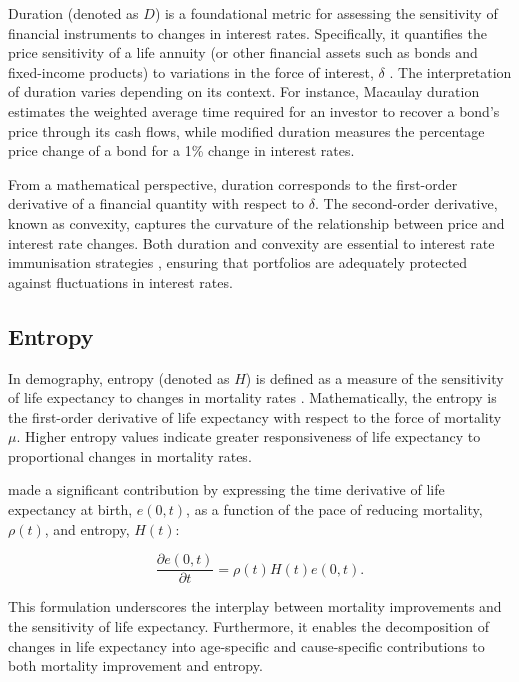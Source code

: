 \documentclass[12pt]{article}
\begin{document}
Duration (denoted as $D$) is a foundational metric for assessing the sensitivity of financial instruments to changes in interest rates. Specifically, it quantifies the price sensitivity of a life annuity (or other financial assets such as bonds and fixed-income products) to variations in the force of interest, $\delta$ \citep{milevsky2013life,charupat2016sluggish}. The interpretation of duration varies depending on its context. For instance, Macaulay duration estimates the weighted average time required for an investor to recover a bond's price through its cash flows, while modified duration measures the percentage price change of a bond for a 1\% change in interest rates.

From a mathematical perspective, duration corresponds to the first-order derivative of a financial quantity with respect to $\delta$. The second-order derivative, known as convexity, captures the curvature of the relationship between price and interest rate changes. Both duration and convexity are essential to interest rate immunisation strategies \citep{redington1951papers,fisher1971coping,shiu1990redington,santomero1997financial,courtois2007immunization}, ensuring that portfolios are adequately protected against fluctuations in interest rates.

\subsection{Entropy}\label{sec:Entropy}

In demography, entropy (denoted as $H$) is defined as a measure of the sensitivity of life expectancy to changes in mortality rates \citep{leser1955variations,keyfitz1977difference,demetrius1974demographic,goldman1986new, aburto2019threshold}. Mathematically, the entropy is the first-order derivative of life expectancy with respect to the force of mortality $\mu$. Higher entropy values indicate greater responsiveness of life expectancy to proportional changes in mortality rates.

\citet{Vaupel2003} made a significant contribution by expressing the time derivative of life expectancy at birth, $e(0, t)$, as a function of the pace of reducing mortality, $\rho(t)$, and entropy, $H(t)$:

\begin{equation}\label{eq:lifeexpdecomp}
	\dfrac{\partial e(0,t)}{\partial t} = \rho(t) H(t) e(0,t).
\end{equation}

This formulation underscores the interplay between mortality improvements and the sensitivity of life expectancy. Furthermore, it enables the decomposition of changes in life expectancy into age-specific and cause-specific contributions to both mortality improvement and entropy.
\end{document}
